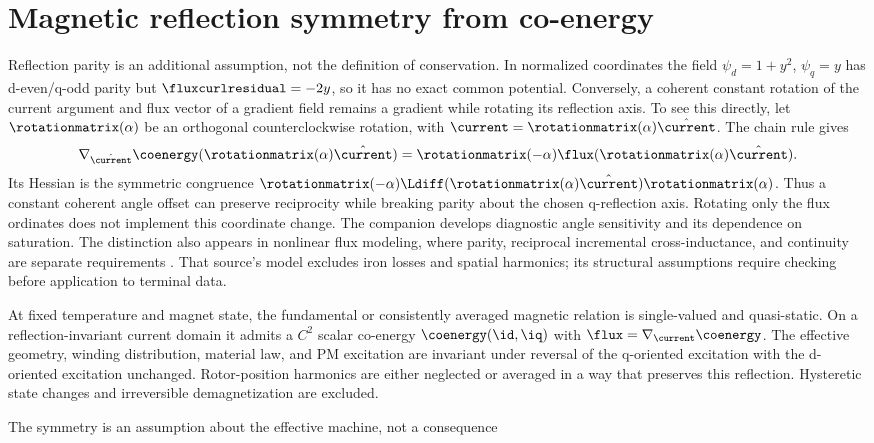 \section{Magnetic reflection symmetry from co-energy}
\label{sec:symmetry}
Reflection parity is an additional assumption, not the definition of
conservation. In normalized coordinates the field
$\psi_d=1+y^2$, $\psi_q=y$ has d-even/q-odd parity but
$\fluxcurlresidual=-2y$, so it has no exact common potential.
Conversely, a coherent constant rotation of the current argument and flux
vector of a gradient field remains a gradient while rotating its reflection
axis. To see this directly, let $\rotationmatrix(\alpha)$ be an orthogonal
counterclockwise rotation, with $\current=\rotationmatrix(\alpha)\hat\current$.
The chain rule gives
\begin{equation}
 \nabla_{\hat\current}\coenergy(\rotationmatrix(\alpha)\hat\current)
 =\rotationmatrix(-\alpha)\flux(\rotationmatrix(\alpha)\hat\current).
 \label{eq:rotated-potential}
\end{equation}
Its Hessian is the symmetric congruence
$\rotationmatrix(-\alpha)\Ldiff(\rotationmatrix(\alpha)\hat\current)
 \rotationmatrix(\alpha)$. Thus a constant coherent angle offset can preserve
reciprocity while breaking parity about the chosen q-reflection axis. Rotating
only the flux ordinates does not implement this coordinate change. The companion
develops diagnostic angle sensitivity and its dependence on saturation.
The distinction also appears in nonlinear flux modeling, where parity, reciprocal incremental
cross-inductance, and continuity are separate requirements
\cite{sun2020}. That source's model excludes iron losses and spatial harmonics;
its structural assumptions require checking before application to terminal data.
\begin{assumption}
At fixed temperature and magnet state, the fundamental or consistently
averaged magnetic relation is single-valued and quasi-static. On a
reflection-invariant current domain it admits a $C^2$ scalar co-energy
$\coenergy(\id,\iq)$ with $\flux=\nabla_{\current}\coenergy$.
The effective geometry, winding distribution, material law, and PM excitation
are invariant under reversal of the q-oriented excitation with the d-oriented
excitation unchanged. Rotor-position harmonics are either neglected or
averaged in a way that preserves this reflection. Hysteretic state changes
and irreversible demagnetization are excluded.
\end{assumption}
The symmetry is an assumption about the effective machine, not a consequence
